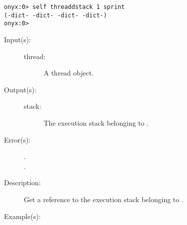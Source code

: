 \begin{description}
\begin{description}
\begin{verbatim}
onyx:0> self threaddstack 1 sprint
(-dict- -dict- -dict- -dict-)
onyx:0>
		\end{verbatim}
	\end{description}
\label{systemdict:threadestack}
\item[{\onyxop{thread}{threadestack}{stack}}: ]
	\begin{description}\item[]
	\item[Input(s): ]
		\begin{description}\item[]
		\item[thread: ]
			A thread object.
		\end{description}
	\item[Output(s): ]
		\begin{description}\item[]
		\item[stack: ]
			The execution stack belonging to .
		\end{description}
	\item[Error(s): ]
		\begin{description}\item[]
		\item[.]
		\item[.]
		\end{description}
	\item[Description: ]
		Get a reference to the execution stack belonging to
		.
	\item[Example(s): ]\begin{verbatim}


\end{verbatim}
\end{description}
\end{description}
